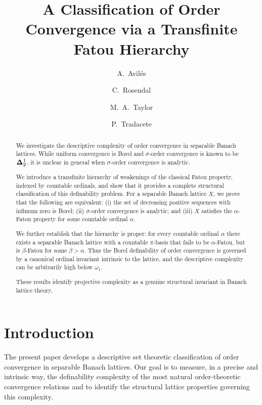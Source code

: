 \documentclass[10pt]{amsart}
\title[A Classification of Order Convergence]{A Classification of Order Convergence via a Transfinite Fatou Hierarchy}
\author{A.~Avil\'es}
\author {C.~Rosendal}
\author{M.~A.\ Taylor}
\author{P.~Tradacete}
\newcommand {\1}{\mathbb 1}
\newcommand{\om}{\omega}
\theoremstyle{plain}
\theoremstyle{definition}
\begin{document}




\begin{abstract}
    We investigate the descriptive complexity of order convergence in separable Banach lattices. While uniform convergence is Borel and $\sigma$-order convergence is known to be ${\bf \Delta}^1_2$, it is unclear in general when $\sigma$-order convergence is analytic.

We introduce a transfinite hierarchy of weakenings of the classical Fatou property, indexed by countable ordinals, and show that it provides a complete structural classification of this definability problem. For a separable Banach lattice 
$X$, we prove that the following are equivalent: (i) the set of decreasing positive sequences with infimum zero is Borel; (ii) $\sigma$-order convergence is analytic; and (iii) 
$X$ satisfies the $\alpha$-Fatou property for some countable ordinal $\alpha$.

We further establish that the hierarchy is proper: for every countable ordinal $\alpha$ there exists a separable Banach lattice with a countable $\pi$-basis that fails to be $\alpha$-Fatou, but is $\beta$-Fatou for some $\beta>\alpha$. Thus the Borel definability of order convergence is governed by a canonical ordinal invariant intrinsic to the lattice, and the descriptive complexity can be arbitrarily high below $\om_1$.

These results identify projective complexity as a genuine structural invariant in Banach lattice theory.
\end{abstract}



\maketitle



\section{Introduction}
The present paper develops a descriptive set theoretic classification of order convergence in separable Banach lattices. Our goal is to measure, in a precise and intrinsic way, the definability complexity of the most natural order-theoretic convergence relations and to identify the structural lattice properties governing this complexity.
\end{document}
